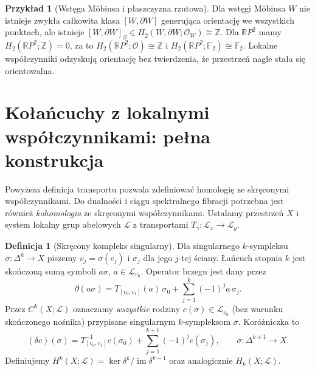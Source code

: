 \documentclass[11pt,a4paper,oneside]{report}
\newcommand{\R}{\mathbb{R}}
\newcommand{\Z}{\mathbb{Z}}
\theoremstyle{plain}
\theoremstyle{definition}
\newtheorem{definicja}[twierdzenie]{Definicja}
\newtheorem{przyklad}[twierdzenie]{Przykład}
\theoremstyle{remark}
\begin{document}
\begin{przyklad}[Wstęga Möbiusa i płaszczyzna rzutowa]
Dla wstęgi Möbiusa $W$
nie istnieje zwykła
całkowita klasa
$[W,\partial W]$
generująca orientację
we wszystkich punktach,
ale istnieje
$[W,\partial W]_{\mathcal O}
\in H_2(W,\partial W;\mathcal O_W)
\cong\Z$.
Dla $\R P^2$ mamy
$H_2(\R P^2;\Z)=0$,
za to
$H_2(\R P^2;\mathcal O)\cong\Z$
i $H_2(\R P^2;\mathbb F_2)
\cong\mathbb F_2$.
Lokalne współczynniki
odzyskują orientację
bez twierdzenia,
że przestrzeń nagle
stała się orientowalna.
\end{przyklad}

\section{Kołańcuchy z lokalnymi współczynnikami: pełna konstrukcja}
\label{sec:lokalne-kolancuchy-v4}

Powyższa definicja transportu pozwala zdefiniować homologię
ze skręconymi współczynnikami. Do dualności i ciągu
spektralnego fibracji potrzebna jest również \emph{kohomologia}
ze skręconymi współczynnikami. Ustalamy przestrzeń $X$ i
system lokalny grup abelowych $\mathcal L$ z transportami
$T_\gamma:\mathcal L_x\to\mathcal L_y$.

\begin{definicja}[Skręcony kompleks singularny]
Dla singularnego $k$-sympleksu $\sigma:\Delta^k\to X$
piszemy $v_j=\sigma(e_j)$ i $\sigma_j$ dla jego $j$-tej
ściany. Łańcuch stopnia $k$ jest skończoną sumą symboli
$a\sigma$, $a\in\mathcal L_{v_0}$. Operator brzegu jest dany
przez
\[
\partial(a\sigma)=T_{[v_0,v_1]}(a)\,\sigma_0
+\sum_{j=1}^k(-1)^j a\,\sigma_j.
\]
Przez $C^k(X;\mathcal L)$ oznaczamy \emph{wszystkie} rodziny
$c(\sigma)\in\mathcal L_{v_0}$ (bez warunku skończonego nośnika)
przypisane singularnym $k$-sympleksom $\sigma$.
Koróżniczka to
\[
(\delta c)(\sigma)=T_{[v_0,v_1]}^{-1}c(\sigma_0)
+\sum_{j=1}^{k+1}(-1)^j c(\sigma_j),
\qquad\sigma:\Delta^{k+1}\to X.
\]
Definiujemy $H^k(X;\mathcal L)=\ker\delta^k/\operatorname{im}
\delta^{k-1}$ oraz analogicznie $H_k(X;\mathcal L)$.
\end{definicja}
\end{document}
